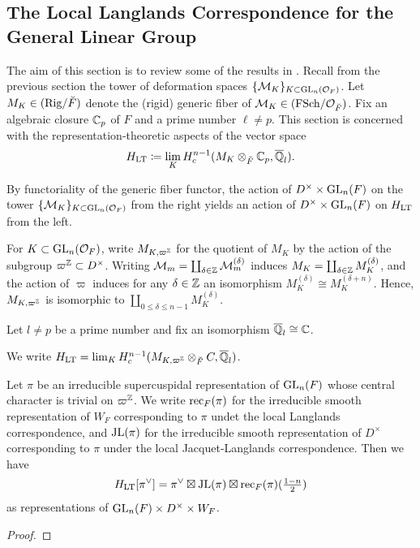 \documentclass[../main.tex]{subfiles}
\begin{document}
\subsection{The Local Langlands Correspondence for the General Linear Group} %
\label{sub:The Local Langlands Correspondence for the General Linear Group}
The aim of this section is to review some of the results in \cite{HTShimura}. 
Recall from the previous section the tower of deformation spaces 
$\{\mathcal{M}_K\}_{K \subset \operatorname{GL}_n(\mathcal{O}_F)}$. Let $M_K \in {(\mathrm{Rig}/{{\breve {F}}})}$ denote the
(rigid) generic fiber of $\mathcal{M}_K \in {(\mathrm{FSch}/{\mathcal{O}_{{\breve {F}}}})}$. Fix an algebraic closure $\mathbb{C}_p$ of $F$ and a prime number $\ell
\neq p$. This section is concerned with the representation-theoretic aspects of
the vector space
\begin{equation*}
  H_{\mathrm{LT}} \coloneqq \lim_K H^{n-1}_c (M_{K} \otimes_{\breve F} \mathbb{C}_p, \overline {\mathbb{Q}}_l).
\end{equation*}

By functoriality of the generic fiber functor, the action of $D^\times \times
\operatorname{GL}_n(F)$ on the tower $\{\mathcal{M}_K\}_{K \subset \operatorname{GL}_n(\mathcal{O}_F)}$ from the right
yields an action of $D^\times \times \operatorname{GL}_n(F)$ on $H_{\mathrm{LT}}$ from the left. 

For $K \subset \operatorname{GL}_n(\mathcal{O}_F)$, write $M_{K, \varpi^{\mathbb{Z}}}$ for the quotient of 
$M_K$  by the action of the subgroup
$\varpi^{\mathbb{Z}} \subset D^\times$. Writing $\mathcal{M}_m = \coprod_{\delta \in \mathbb{Z}} \mathcal{M}_m^{(\delta)}$
induces $M_K = \coprod_{\delta \in\mathbb{Z}} M_K^{(\delta)}$, and 
the action of $\varpi$ induces for any $\delta \in \mathbb{Z}$ an isomorphism 
$M_K^{(\delta)} \cong M_K^{(\delta +n)}$. Hence, $M_{K, \varpi^{\mathbb{Z}}}$ is 
isomorphic to $\coprod_{0 \leq \delta \leq n-1} M_{K}^{(\delta)}$. 

Let $l \neq p$ be a prime number and fix an isomorphism $\overline {\mathbb{Q}}_l \cong \mathbb{C}$.

\begin{defi}
  We write $H_{\mathrm{LT}} = \lim_{K} H^{n-1}_c (M_{K, \varpi^{\mathbb{Z}}} \otimes_{\breve F} C, \overline {\mathbb{Q}}_l)$.
\end{defi}

\begin{thm}
  Let $\pi$ be an irreducible supercuspidal representation of $\operatorname{GL}_n(F)$ whose central
  character is trivial on $\varpi^{\mathbb{Z}}$. We write $\mathrm{rec}_F(\pi)$ for the irreducible 
  smooth representation of $W_F$ corresponding to $\pi$ undet the local Langlands
  correspondence, and $\mathrm{JL}(\pi)$ for the irreducible smooth representation of
  $D^\times$ corresponding to $\pi$ under the local Jacquet-Langlands correspondence.
  Then we have 
  \begin{equation*}
    H_{\mathrm{LT}}[\pi^\vee] = \pi^\vee \boxtimes \mathrm{JL}(\pi) \boxtimes \mathrm{rec}_F(\pi)(\tfrac{1-n}2)
  \end{equation*}
  as representations of $\operatorname{GL}_n(F) \times D^\times \times W_F$. 
\begin{proof}
\end{proof}
\end{thm}
\end{document}
